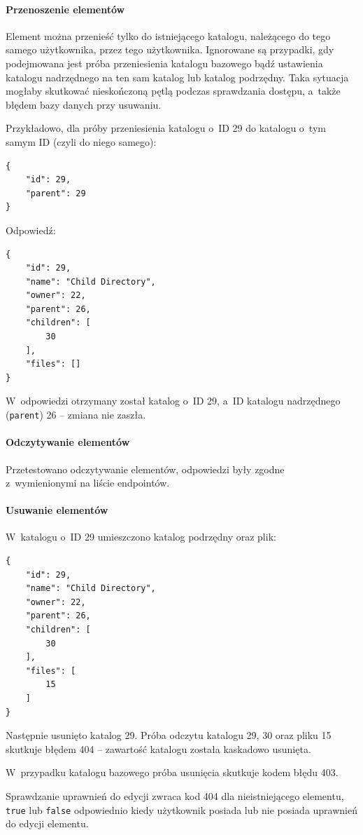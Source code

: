 \documentclass[a4paper,twoside,12pt]{book}
\begin{document}
\paragraph{Przenoszenie elementów}
Element można przenieść tylko do istniejącego katalogu, należącego do tego samego użytkownika, przez tego użytkownika. Ignorowane są przypadki, gdy podejmowana jest próba przeniesienia katalogu bazowego bądź ustawienia katalogu nadrzędnego na ten sam katalog lub katalog podrzędny. Taka sytuacja mogłaby skutkować nieskończoną pętlą podczas sprawdzania dostępu, a~także błędem bazy danych przy usuwaniu.

Przykładowo, dla próby przeniesienia katalogu o~ID 29 do katalogu o~tym samym ID (czyli do niego samego):

\begin{verbatim}
{
	"id": 29,
	"parent": 29
}
\end{verbatim}
Odpowiedź:
\begin{verbatim}
{
	"id": 29,
	"name": "Child Directory",
	"owner": 22,
	"parent": 26,
	"children": [
		30
	],
	"files": []
}
\end{verbatim}

W~odpowiedzi otrzymany został katalog o~ID 29, a~ID katalogu nadrzędnego (\texttt{parent}) 26 -- zmiana nie zaszła.

\paragraph{Odczytywanie elementów}
Przetestowano odczytywanie elementów, odpowiedzi były zgodne z~wymienionymi na liście endpointów.

\paragraph{Usuwanie elementów}
W~katalogu o~ID 29 umieszczono katalog podrzędny oraz plik:
\begin{verbatim}
{
	"id": 29,
	"name": "Child Directory",
	"owner": 22,
	"parent": 26,
	"children": [
		30
	],
	"files": [
		15
	]
}
\end{verbatim}
Następnie usunięto katalog 29. Próba odczytu katalogu 29, 30 oraz pliku 15 skutkuje błędem 404 -- zawartość katalogu została kaskadowo usunięta.

W~przypadku katalogu bazowego próba usunięcia skutkuje kodem błędu 403.

Sprawdzanie uprawnień do edycji zwraca kod 404 dla nieistniejącego elementu, \texttt{true} lub \texttt{false} odpowiednio kiedy użytkownik posiada lub nie posiada uprawnień do edycji elementu.
\end{document}
